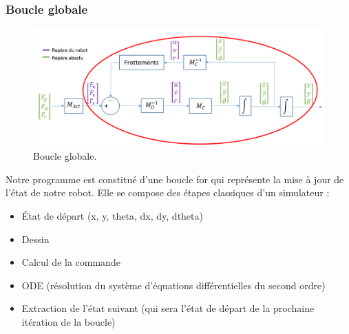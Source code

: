 \documentclass[a4paper,10pt]{article}
\begin{document}
\subsubsection{Boucle globale}
\begin{figure}[H]
\bigcenter\includegraphics[scale=0.5]{images/boucle_global.png}
\caption{Boucle globale.}
\end{figure}

Notre programme est constitué d’une boucle for qui représente la mise à jour de l’état de notre robot. Elle se compose des étapes classiques d’un simulateur :
\begin{itemize}
\item État de départ (x, y, theta, dx, dy, dtheta)
\item Dessin
\item Calcul de la commande
\item ODE (résolution du système d’équations différentielles du second ordre)
\item Extraction de l’état suivant (qui sera l’état de départ de la prochaine itération de la boucle)
\end{itemize}
\end{document}
